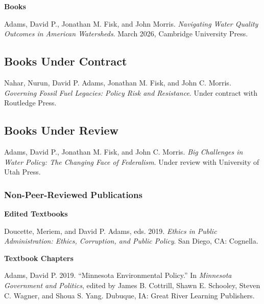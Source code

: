 \documentclass[12pt,letterpaper]{article}
\renewenvironment{itemize}{
  \begin{list}{}{
    \setlength{\leftmargin}{1.5em}
    \setlength{\itemsep}{0.25em}
    \setlength{\parskip}{0pt}
    \setlength{\parsep}{0.25em}
  }
}{
  \end{list}
}
\begin{document}
\textbf{Books}
\begin{itemize}\leftmargin=2pt\itemindent=-15pt
  \item Adams, David P., Jonathan M. Fisk, and John Morris. \emph{Navigating Water Quality Outcomes in American Watersheds}. March 2026, Cambridge University Press.
\end{itemize}

\subsection*{Books Under Contract}

\begin{itemize}\leftmargin=2pt\itemindent=-15pt
  \item Nahar, Nurun, David P. Adams, Jonathan M. Fisk, and John C. Morris. \emph{Governing Fossil Fuel
  Legacies: Policy Risk and Resistance}. Under contract with Routledge Press.
\end{itemize}

\subsection*{Books Under Review}
\begin{itemize}\leftmargin=2pt\itemindent=-15pt
  \item Adams, David P., Jonathan M. Fisk, and John C. Morris. \emph{Big Challenges in Water Policy: The Changing Face of Federalism}. Under review with University of Utah Press.
\end{itemize}

\subsubsection*{Non-Peer-Reviewed Publications}

\textbf{Edited Textbooks}
\begin{itemize}\leftmargin=2pt\itemindent=-15pt
    \item Doucette, Meriem, and David P. Adams, eds. 2019. \emph{Ethics in Public Administration: Ethics, Corruption, and Public Policy}. San Diego, CA: Cognella.
\end{itemize}

\textbf{Textbook Chapters}
\begin{itemize}\leftmargin=2pt\itemindent=-15pt
    \item Adams, David P. 2019. ``Minnesota Environmental Policy.'' In \emph{Minnesota Government and Politics}, edited by James B. Cottrill, Shawn E. Schooley, Steven C. Wagner, and Shoua S. Yang. Dubuque, IA: Great River Learning Publishers.
\end{itemize}
\end{document}
